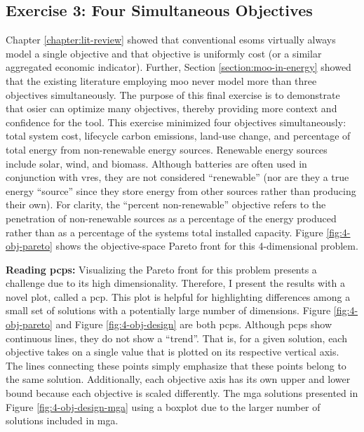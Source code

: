 
\subsection{Exercise 3: Four Simultaneous Objectives}
Chapter \ref{chapter:lit-review} showed that conventional \acp{esom} virtually
always model a single objective and that objective is uniformly cost (or a
similar aggregated economic indicator). Further, Section
\ref{section:moo-in-energy} showed that the existing literature employing
\ac{moo} never model more than three objectives simultaneously. The purpose of
this final exercise is to demonstrate that \ac{osier} can optimize many
objectives, thereby providing more context and confidence for the tool. This
exercise minimized four objectives simultaneously: total system cost, lifecycle
carbon emissions, land-use change, and percentage of total energy from
non-renewable energy sources. Renewable energy sources include solar, wind, and
biomass. Although batteries are often used in conjunction with \acp{vre}, they
are not considered ``renewable'' (nor are they a true energy ``source'' since
they store energy from other sources rather than producing their own). For
clarity, the ``percent non-renewable'' objective refers to the penetration of
non-renewable sources as a percentage of the energy produced rather than as a
percentage of the systems total installed capacity. Figure
\ref{fig:4-obj-pareto} shows the objective-space Pareto front for this
4-dimensional problem.

\begin{noteBox}
\textbf{Reading \Aclp{pcp}:} Visualizing the Pareto front for this problem
presents a challenge due to its high dimensionality. Therefore, I present the
results with a novel plot, called a \ac{pcp}. This plot is helpful for
highlighting differences among a small set of solutions with a potentially large
number of dimensions. Figure \ref{fig:4-obj-pareto} and Figure
\ref{fig:4-obj-design} are both \acp{pcp}. Although \acp{pcp} show continuous
lines, they do not show a ``trend''. That is, for a given solution, each
objective takes on a single value that is plotted on its respective vertical
axis. The lines connecting these points simply emphasize that these points
belong to the same solution. Additionally, each objective axis has its own upper
and lower bound because each objective is scaled differently. The \ac{mga}
solutions presented in Figure \ref{fig:4-obj-design-mga} using a boxplot due to
the larger number of solutions included in \ac{mga}. 
\end{noteBox}


